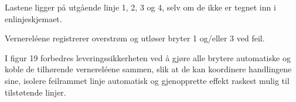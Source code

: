 \vskip 10pt

Lastene ligger på utgående linje 1, 2, 3 og 4, selv om de ikke er tegnet inn i enlinjeskjemaet.

\vskip 10pt

Vernereléene registrerer overstrøm og utløser bryter 1 og/eller 3 ved feil.

\vskip 10pt

I figur 19 forbedres leveringssikkerheten ved å gjøre alle brytere automatiske og koble de tilhørende vernereléene sammen, slik at de kan koordinere handlingene sine, isolere feilrammet linje automatisk og gjenopprette effekt raskest mulig til tilstøtende linjer.



